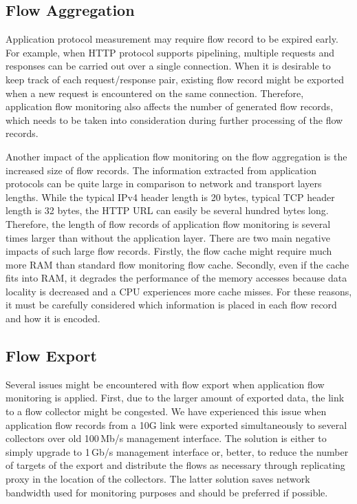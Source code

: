 \subsection{Flow Aggregation}

Application protocol measurement may require flow record to be expired early. For example, when HTTP protocol supports pipelining, multiple requests and responses can be carried out over a single connection. When it is desirable to keep track of each request/response pair, existing flow record might be exported when a new request is encountered on the same connection. Therefore, application flow monitoring  also affects the number of generated flow records, which needs to be taken into consideration during further processing of the flow records.


Another impact of the application flow monitoring on the flow aggregation is the increased size of flow records. The information extracted from application protocols can be quite large in comparison to network and transport layers lengths. While the typical IPv4 header length is 20 bytes, typical TCP header length is 32 bytes, the HTTP URL can easily be several hundred bytes long. Therefore, the length of flow records of application flow monitoring is several times larger than without the application layer. There are two main negative impacts of such large flow records. Firstly, the flow cache might require much more RAM than standard flow monitoring flow cache. Secondly, even if the cache fits into RAM, it degrades the performance of the memory accesses because data locality is decreased and a CPU experiences more cache misses. For these reasons, it must be carefully considered which information is placed in each flow record and how it is encoded.

\subsection{Flow Export}

Several issues might be encountered with flow export when application flow monitoring is applied. First, due to the larger amount of exported data, the link to a flow collector might be congested. We have experienced this issue when application flow records from a 10G link were exported simultaneously to several collectors over old 100\,Mb/s management interface. The solution is either to simply upgrade to 1\,Gb/s management interface or, better, to reduce the number of targets of the export and distribute the flows as necessary through replicating proxy in the location of the collectors. The latter solution saves network bandwidth used for monitoring purposes and should be preferred if possible.


